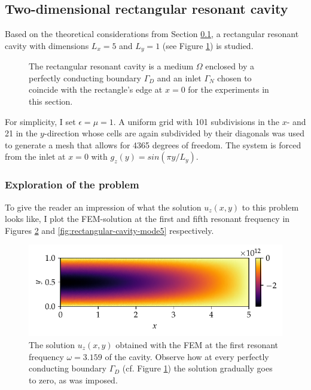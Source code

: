 \documentclass[11pt, a4paper]{article}
\begin{document}
\subsection{Two-dimensional rectangular resonant cavity}
\label{subsec:examples-rectangularcavity}

Based on the theoretical considerations from Section \ref{subsec:examples-rectangularcavity},
a rectangular resonant cavity with dimensions $L_x=5$ and $L_y=1$ (see Figure 
\ref{fig:rectangular_cavity}) is studied.
\begin{figure}[h]
    \centering
    
    \caption{The rectangular resonant cavity is a medium $\Omega$ enclosed
    by a perfectly conducting boundary $\Gamma_D$ and an inlet $\Gamma_N$
    chosen to coincide with the rectangle's edge at $x=0$ for the experiments in this
    section.}
    \label{fig:rectangular_cavity}
\end{figure}

For simplicity, I set $\epsilon=\mu=1$. A uniform grid with 101 subdivisions in
the $x$- and 21 in the $y$-direction whose cells are again subdivided by their
diagonals was used to generate a mesh that allows for 4365 degrees of freedom.
The system is forced from the inlet at $x=0$ with $g_z(y) = sin(\pi y / L_y)$.

\subsubsection{Exploration of the problem}
\label{subsubsec:exploration}

To give the reader an impression of what the solution $u_z(x, y)$ to this problem
looks like, I plot the \acrshort{FEM}-solution at the first and fifth resonant
frequency in Figures \ref{fig:rectangular-cavity-mode1} and \ref{fig:rectangular-cavity-mode5}
respectively.

\begin{figure}[ht]
    \centering
    \includegraphics{plots/rectangular_cavity_mode1.pdf}
    \caption{The solution $u_z(x, y)$ obtained with the \acrshort{FEM} at the
    first resonant frequency $\omega = 3.159$ of the cavity. Observe how at
    every perfectly conducting boundary $\Gamma_D$ (cf. Figure
    \ref{fig:rectangular_cavity}) the solution gradually goes to zero, as was imposed.}
    \label{fig:rectangular-cavity-mode1}
\end{figure}
\end{document}
